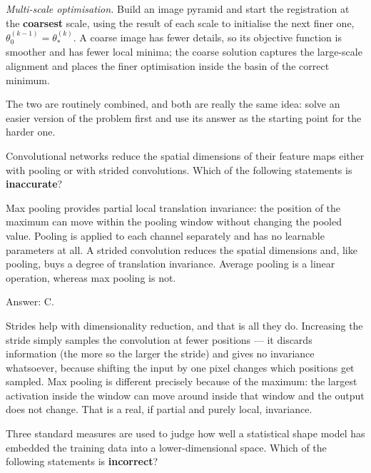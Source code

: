 \documentclass[11pt]{exam}
\newcommand{\answerspace}[1]{\ifprintanswers\else\vspace{#1}\fi}
\begin{document}
\begin{questions}
\begin{solution}
  \emph{Multi-scale optimisation.} Build an image pyramid and start the registration at the
  \textbf{coarsest} scale, using the result of each scale to initialise the next finer one,
  $\theta^{(k-1)}_0 = \theta^{(k)}_*$. A coarse image has fewer details, so its objective function
  is smoother and has fewer local minima; the coarse solution captures the large-scale alignment
  and places the finer optimisation inside the basin of the correct minimum.

  The two are routinely combined, and both are really the same idea: solve an easier version of the
  problem first and use its answer as the starting point for the harder one.
\end{solution}
\answerspace{7.5cm}

\question
Convolutional networks reduce the spatial dimensions of their feature maps either with pooling or
with strided convolutions. Which of the following statements is \textbf{inaccurate}?

\begin{choices}
  \choice Max pooling provides partial local translation invariance: the position of the maximum
  can move within the pooling window without changing the pooled value.
  \choice Pooling is applied to each channel separately and has no learnable parameters at all.
  \choice A strided convolution reduces the spatial dimensions and, like pooling, buys a degree of
  translation invariance.
  \choice Average pooling is a linear operation, whereas max pooling is not.
\end{choices}

\begin{solution}
  Answer: C.

  Strides help with dimensionality reduction, and that is all they do. Increasing the stride simply
  samples the convolution at fewer positions --- it discards information (the more so the larger the
  stride) and gives no invariance whatsoever, because shifting the input by one pixel changes which
  positions get sampled. Max pooling is different precisely because of the maximum: the largest
  activation inside the window can move around inside that window and the output does not change.
  That is a real, if partial and purely local, invariance.
\end{solution}

\question
Three standard measures are used to judge how well a statistical shape model has embedded the
training data into a lower-dimensional space. Which of the following statements is
\textbf{incorrect}?


\end{questions}
\end{document}
